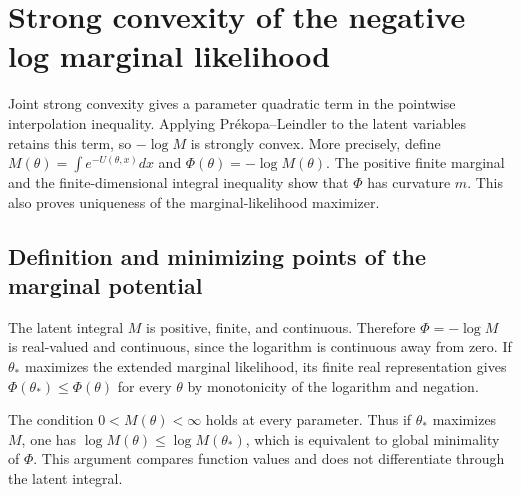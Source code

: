 \documentclass[11pt,a4paper]{report}
\begin{document}
\section{\texorpdfstring{Strong convexity of the negative log marginal likelihood}{Strong convexity of the negative log marginal likelihood}}
\label{proof-module-IPLA-StrongLogConcavity-lean}


Joint strong convexity gives a parameter quadratic term in the pointwise interpolation inequality. Applying Prékopa–Leindler to the latent variables retains this term, so \(-\log M\) is strongly convex. More precisely, define \(M(\theta)=\int e^{-U(\theta,x)}dx\) and \(\Phi(\theta)=-\log M(\theta)\). The positive finite marginal and the finite-dimensional integral inequality show that \(\Phi\) has curvature \(m\). This also proves uniqueness of the marginal-likelihood maximizer.

\subsection{\texorpdfstring{Definition and minimizing points of the marginal potential}{Definition and minimizing points of the marginal potential}}
\label{report-step-IPLA-StrongLogConcavity-lean-1}


The latent integral \(M\) is positive, finite, and continuous. Therefore \(\Phi=-\log M\) is real-valued and continuous, since the logarithm is continuous away from zero. If \(\theta_*\) maximizes the extended marginal likelihood, its finite real representation gives \(\Phi(\theta_*)\le\Phi(\theta)\) for every \(\theta\) by monotonicity of the logarithm and negation.



The condition \(0<M(\theta)<\infty\) holds at every parameter. Thus if \(\theta_*\) maximizes \(M\), one has \(\log M(\theta)\le\log M(\theta_*)\), which is equivalent to global minimality of \(\Phi\). This argument compares function values and does not differentiate through the latent integral.
\end{document}

